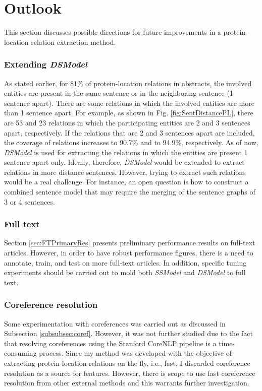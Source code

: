 \chapter{Outlook}\label{chapter:outlook}

This section discusses possible directions for future improvements in a protein-location relation extraction method.

\subsection{Extending \textit{DSModel}}

As stated earlier, for 81\% of protein-location relations in abstracts, the involved entities are present in the same sentence or in the neighboring sentence (1 sentence apart). There are some relations in which the involved entities are more than 1 sentence apart. For example, as shown in Fig. \ref{fig:SentDistancePL}, there are 53 and 23 relations in which the participating entities are 2 and 3 sentences apart, respectively. If the relations that are 2 and 3 sentences apart are included, the coverage of relations increases to 90.7\% and to 94.9\%, respectively. As of now, \textit{DSModel} is used for extracting the relations in which the entities are present 1 sentence apart only. Ideally, therefore, \textit{DSModel} would be extended to extract relations in more distance sentences. However, trying to extract such relations would be a real challenge. For instance, an open question is how to construct a combined sentence model that may require the merging of the sentence graphs of 3 or 4 sentences.

\subsection{Full text}

Section \ref{sec:FTPrimaryRes} presents preliminary performance results on full-text articles. However, in order to have robust performance figures, there is a need to annotate, train, and test on more full-text articles. In addition, specific tuning experiments should be carried out to mold both \textit{SSModel} and \textit{DSModel} to full text.

\subsection{Coreference resolution}

Some experimentation with coreferences was carried out as discussed in Subsection \ref{subsubsec:coref}. However, it was not further studied due to the fact that resolving coreferences using the Stanford CoreNLP pipeline \cite{manning2014stanford} is a time-consuming process. Since my method was developed with the objective of extracting protein-location relations on the fly, i.e., fast, I discarded coreference resolution as a source for features. However, there is scope to use fast coreference resolution from other external methods and this warrants further investigation.

